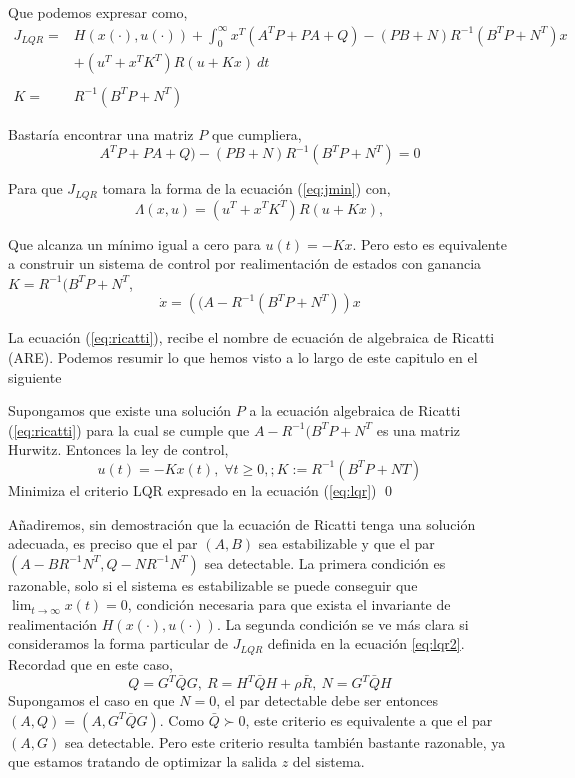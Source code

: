 Que podemos expresar como,
\begin{equation}
\begin{split}
J_{LQR}=&H\left(x(\cdot),u(\cdot)\right) + \int_0^{\infty}x^T(A^TP+PA+Q)-(PB+N)R^{-1}(B^TP+N^T)x\\
&+(u^T+x^TK^T)R(u+Kx)\ dt\\
\ \\
K =& R^{-1}(B^TP+N^T)
\end{split}
\end{equation}

Bastaría encontrar una matriz $P$ que cumpliera,
\begin{equation}\label{eq:ricatti}
A^TP+PA+Q)-(PB+N)R^{-1}(B^TP+N^T) = 0
\end{equation}

Para que $J_{LQR}$ tomara la forma de la ecuación (\ref{eq:jmin}) con,
\begin{equation*}
\Lambda(x,u) = (u^T+x^TK^T)R(u+Kx),
\end{equation*} 

Que alcanza un mínimo igual a cero para $u(t) = -Kx$.  Pero esto es equivalente a construir un sistema de control por realimentación de estados con ganancia $K = R^{-1}(B^TP+N^T$,
\begin{equation}
\dot x = \left((A-R^{-1}(B^TP+N^T)\right)x
\end{equation}

La ecuación (\ref{eq:ricatti}), recibe el nombre de ecuación de algebraica de Ricatti (ARE). Podemos resumir lo que hemos visto a lo largo de este capitulo en el siguiente 

\begin{theorem}
Supongamos que existe una solución $P$ a la ecuación algebraica de Ricatti (\ref{eq:ricatti}) para la cual se cumple que $A-R^{-1}(B^TP+N^T$ es una matriz Hurwitz. Entonces la ley de control,
\begin{equation*}
u(t) = -Kx(t),\; \forall t \geq 0,; K:=R^{-1}(B^TP+NT)
\end{equation*}
Minimiza el criterio LQR expresado en la ecuación (\ref{eq:lqr})
\qed
\end{theorem}

Añadiremos, sin demostración que la ecuación de Ricatti tenga una solución adecuada, es preciso que el par $(A,B)$ sea estabilizable y que el par $(A-BR^{-1}N^T,Q-NR^{-1}N^T)$ sea detectable. La primera condición es razonable, solo si el sistema es estabilizable se puede conseguir que $\lim_{t\rightarrow \infty} x(t)= 0$, condición necesaria para que exista el invariante de realimentación $H(x(\cdot),u(\cdot))$.  La segunda condición se ve más clara si consideramos la forma particular de $J_{LQR}$ definida en la ecuación \ref{eq:lqr2}. Recordad que en este caso,
\begin{equation*}
 Q = G^T\bar{Q}G,\ R = H^T\bar{Q}H + \rho\bar{R}, \ N = G^T\bar{Q}H 
\end{equation*}   
Supongamos el caso en que  $N = 0$, el par detectable debe ser entonces $(A,Q) = (A,G^T\bar{Q}G)$. Como $\bar{Q} \succ 0$, este criterio es equivalente a que el par $(A,G)$ sea detectable. Pero este criterio resulta también bastante razonable, ya que estamos tratando de optimizar la salida $z$ del sistema. 

